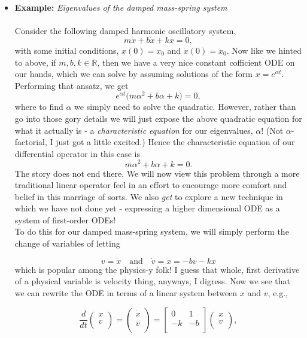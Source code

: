 \begin{itemize}
\item {\bf{Example:}} \emph{Eigenvalues of the damped mass-spring system}\\ \\

Consider the following damped harmonic oscillatory system, $$m \ddot{x} + b \dot{x} + kx = 0,$$
%
with some initial conditions, $x(0)=x_0$ and $\dot{x}(0) = \dot{x}_0.$ Now like we hinted to above, if $m,b,k\in\mathbb{R}$, then we have a very nice constant cofficient ODE on our hands, which we can solve by assuming solutions of the form $x=e^{\alpha t}.$\\

Performing that ansatz, we get $$e^{\alpha t} \big( m\alpha^2 + b \alpha + k \big) = 0,$$
%
where to find $\alpha$ we simply need to solve the quadratic. However, rather than go into those gory details we will just expose the above quadratic equation for what it actually is - a \emph{characteristic equation} for our eigenvalues, $\alpha$! (Not $\alpha$-factorial, I just got a little excited.) Hence the characteristic equation of our differential operator in this case is $$m\alpha^2 + b \alpha + k  = 0.$$
%
The story does not end there. We will now view this problem through a more traditional linear operator feel in an effort to encourage more comfort and belief in this marriage of sorts. We also \emph{get} to explore a new technique in which we have not done yet - expressing a higher dimensional ODE as a system of first-order ODEs!\\

To do this for our damped mass-spring system, we will simply perform the change of variables of letting 

$$v = \dot{x} \ \ \ \mbox{ and } \ \ \  \dot{v} = \ddot{x} = -bv - kx$$
%
which is popular among the physics-y folk! I guess that whole, first derivative of a physical variable is velocity thing, anyways, I digress. Now we see that we can rewrite the ODE in terms of a linear system between $x$ and $v$, e.g.,

$$\frac{d}{dt} \left( \begin{array}{c} x \\ v   \\ \end{array} \right)=  \left( \begin{array}{c} \dot{x} \\ \dot{v}   \\ \end{array} \right) = \left[ \begin{array}{cc} 0 & 1 \\ -k & -b \\ \end{array} \right]  \left( \begin{array}{c} x \\ v   \\ \end{array} \right),$$


\end{itemize}
